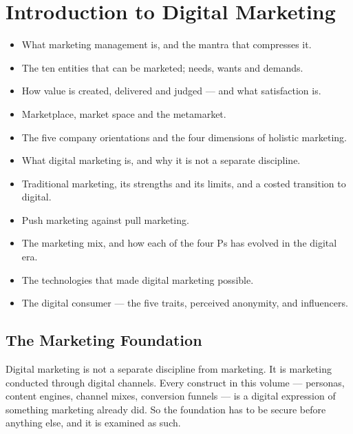 \documentclass{MMTextbook}
\begin{document}
\mainmatter
\pagestyle{mmmain}

\chapter{Introduction to Digital Marketing}


\begin{learningoutcomes}
\begin{itemize}
\item What marketing management is, and the mantra that compresses it.
\item The ten entities that can be marketed; needs, wants and demands.
\item How value is created, delivered and judged --- and what satisfaction is.
\item Marketplace, market space and the metamarket.
\item The five company orientations and the four dimensions of holistic marketing.
\item What digital marketing is, and why it is not a separate discipline.
\item Traditional marketing, its strengths and its limits, and a costed
      transition to digital.
\item Push marketing against pull marketing.
\item The marketing mix, and how each of the four Ps has evolved in the
      digital era.
\item The technologies that made digital marketing possible.
\item The digital consumer --- the five traits, perceived anonymity, and
      influencers.
\end{itemize}
\end{learningoutcomes}

\section{The Marketing Foundation}

Digital marketing is not a separate discipline from marketing. It is marketing
conducted through digital channels. Every construct in this volume ---
personas, content engines, channel mixes, conversion funnels --- is a digital
expression of something marketing already did. So the foundation has to be
secure before anything else, and it is examined as such.
\end{document}
